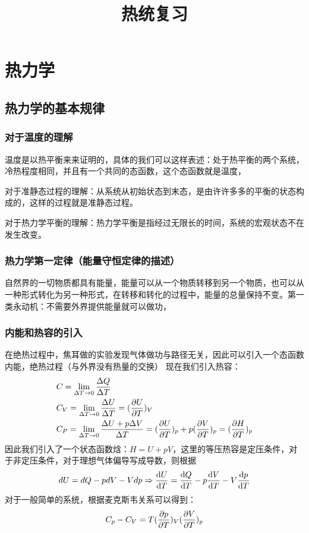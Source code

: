 \documentclass[UTF8]{ctexart}
\begin{document}
\title{热统复习}
\author{}
\date{}
\maketitle
\section{热力学}
\subsection{热力学的基本规律}
\subsubsection{对于温度的理解}
温度是以热平衡来来证明的，具体的我们可以这样表述：处于热平衡的两个系统，冷热程度相同，并且有一个共同的态函数，这个态函数就是温度，

对于准静态过程的理解：从系统从初始状态到末态，是由许许多多的平衡的状态构成的，这样的过程就是准静态过程。

对于热力学平衡的理解：热力学平衡是指经过无限长的时间，系统的宏观状态不在发生改变。
\subsubsection{热力学第一定律（能量守恒定律的描述）}
自然界的一切物质都具有能量，能量可以从一个物质转移到另一个物质，也可以从一种形式转化为另一种形式，在转移和转化的过程中，能量的总量保持不变。第一类永动机：不需要外界提供能量就可以做功，
\subsubsection{内能和热容的引入}
在绝热过程中，焦耳做的实验发现气体做功与路径无关，因此可以引入一个态函数内能，绝热过程（与外界没有热量的交换）
现在我们引入热容：
\begin{align*}
         & C=\lim_{\Delta T \rightarrow 0} \frac{\Delta Q}{\Delta T}                                                          \\
         & C_V=\lim _{\Delta T \rightarrow 0 }\frac{\Delta U}{\Delta T}=(\pdv{U}{T})_V                                        \\
         & C_P=\lim_{\Delta T \rightarrow 0}\frac{\Delta U+p\Delta V}{\Delta T}=(\pdv{U}{T})_p+p(\pdv{V}{T})_p=(\pdv{H}{T})_p
\end{align*}
因此我们引入了一个状态函数焓：$H=U+pV$，这里的等压热容是定压条件，对于非定压条件，对于理想气体偏导写成导数，则根据
\begin{align*}
        dU=dQ-pdV-Vdp\Rightarrow \dv{U}{T}=\dv{Q}{T}-p\dv{V}{T}-V\dv{p}{T}
\end{align*}
对于一般简单的系统，根据麦克斯韦关系可以得到：
\begin{align*}
        C_p-C_V=T(\pdv{p}{T})_V(\pdv{V}{T})_p
\end{align*}
\end{document}
